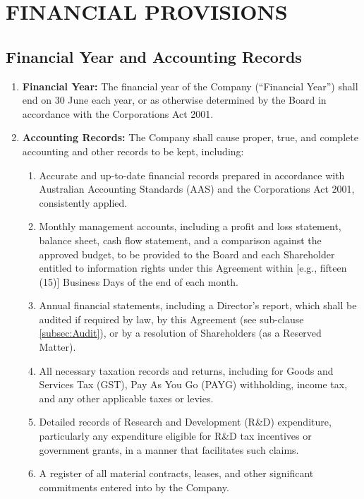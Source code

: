 \section{FINANCIAL PROVISIONS} \label{sec:financial_provisions}

\subsection{Financial Year and Accounting Records}
\begin{enumerate}[label=(\alph*)]
\item \textbf{Financial Year:} The financial year of the Company (``Financial Year'') shall end on 30 June each year, or as otherwise determined by the Board in accordance with the Corporations Act 2001.
\item \textbf{Accounting Records:} The Company shall cause proper, true, and complete accounting and other records to be kept, including:
    \begin{enumerate}[label=(\roman*)]
    \item Accurate and up-to-date financial records prepared in accordance with Australian Accounting Standards (AAS) and the Corporations Act 2001, consistently applied.
    \item Monthly management accounts, including a profit and loss statement, balance sheet, cash flow statement, and a comparison against the approved budget, to be provided to the Board and each Shareholder entitled to information rights under this Agreement within [e.g., fifteen (15)] Business Days of the end of each month.
    \item Annual financial statements, including a Director's report, which shall be audited if required by law, by this Agreement (see sub-clause \ref{subsec:Audit}), or by a resolution of Shareholders (as a Reserved Matter).
    \item All necessary taxation records and returns, including for Goods and Services Tax (GST), Pay As You Go (PAYG) withholding, income tax, and any other applicable taxes or levies.
    \item Detailed records of Research and Development (R\&D) expenditure, particularly any expenditure eligible for R\&D tax incentives or government grants, in a manner that facilitates such claims.
    \item A register of all material contracts, leases, and other significant commitments entered into by the Company.
    \end{enumerate}
\end{enumerate}

